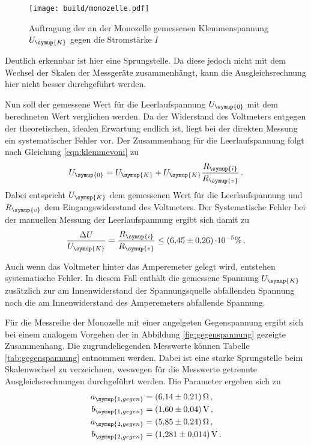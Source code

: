 \begin{figure}
  \centering
  \texttt{[image: build/monozelle.pdf]}
  \caption{Auftragung der an der Monozelle gemessenen Klemmenspannung $U_{\symup{K}}$
  gegen die Stromstärke $I$}
  \label{fig:monozelle}
\end{figure}

Deutlich erkennbar ist hier eine Sprungstelle. Da diese jedoch nicht mit dem Wechsel
der Skalen der Messgeräte zusammenhängt, kann die Ausgleichsrechnung hier nicht besser durchgeführt
werden.

Nun soll der gemessene Wert für die Leerlaufspannung $U_{\symup{0}}$ mit dem
berechneten Wert verglichen werden. Da der Widerstand des Voltmeters entgegen
der theoretischen, idealen Erwartung endlich ist, liegt bei der direkten Messung
ein systematischer Fehler vor. Der Zusammenhang für die Leerlaufspannung folgt
nach Gleichung \eqref{eqn:klemmevoni} zu
\begin{equation}
  U_{\symup{0}}=U_{\symup{K}}+U_{\symup{K}}\frac{R_{\symup{i}}}{R_{\symup{v}}}\,.
\end{equation}
Dabei entspricht $U_{\symup{K}}$ dem gemessenen Wert für die Leerlaufspannung
und $R_{\symup{v}}$ dem Eingangswiderstand des Voltmeters.
Der Systematische Fehler bei der manuellen Messung der Leerlaufspannung ergibt
sich damit zu
\begin{equation}
  \frac{\Delta U}{U_{\symup{K}}}=\frac{R_{\symup{i}}}{R_{\symup{v}}} \leq \SI{6.45(026)}\cdot10^{-5}\%\,.
\end{equation}

Auch wenn das Voltmeter hinter das Amperemeter gelegt wird, entstehen systematische
Fehler. In diesem Fall enthält die gemessene Spannung $U_{\symup{K}}$ zusätzlich
zur am Innenwiderstand der Spannungsquelle abfallenden Spannung noch die am Innenwiderstand
des Amperemeters abfallende Spannung.

Für die Messreihe der Monozelle mit einer angelgeten Gegenspannung ergibt sich
bei einem analogem Vorgehen der in Abbildung \ref{fig:gegenspannung} gezeigte Zusammenhang.
Die zugrundeliegenden Messwerte können Tabelle \ref{tab:gegenspannung} entnommen werden.
Dabei ist eine starke Sprungstelle beim Skalenwechsel zu verzeichnen, weswegen für
die Messwerte getrennte Ausgleichsrechnungen durchgeführt werden. Die Parameter ergeben sich zu
\begin{align}
  a_{\symup{1,gegen}} &= \SI{6.14(021)}{\ohm}\,,\\
  b_{\symup{1,gegen}} &= \SI{1.60(004)}{\volt}\,,\\
  a_{\symup{2,gegen}} &= \SI{5.85(024)}{\ohm}\,,\\
  b_{\symup{2,gegen}} &= \SI{1.281(0014)}{\volt}\,.
\end{align}

